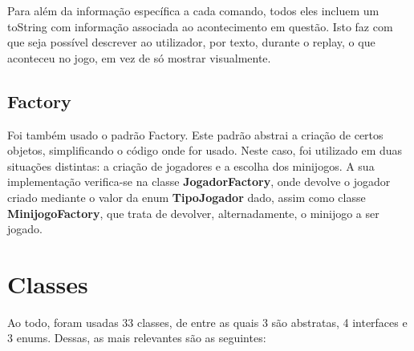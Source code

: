 \documentclass[11pt]{article}
\begin{document}
	Para além da informação específica a cada comando, todos eles incluem um toString com informação associada ao acontecimento em questão. Isto faz com que seja possível descrever ao utilizador, por texto, durante o replay, o que aconteceu no jogo, em vez de só mostrar visualmente.
	
	\large
	\subsection{Factory}
	\normalsize
	
	Foi também usado o padrão Factory. Este padrão abstrai a criação de certos objetos, simplificando o código onde for usado. Neste caso, foi utilizado em duas situações distintas: a criação de jogadores e a escolha dos minijogos. A sua implementação verifica-se na classe \textbf{JogadorFactory}, onde devolve o jogador criado mediante o valor da enum \textbf{TipoJogador} dado, assim como classe \textbf{MinijogoFactory}, que trata de devolver, alternadamente, o minijogo a ser jogado.
	
	\pagebreak
	
	\large
	\section{Classes}
	\normalsize
	
	Ao todo, foram usadas 33 classes, de entre as quais 3 são abstratas, 4 interfaces e 3 enums. Dessas, as mais relevantes são as seguintes: 
	
\end{document}
